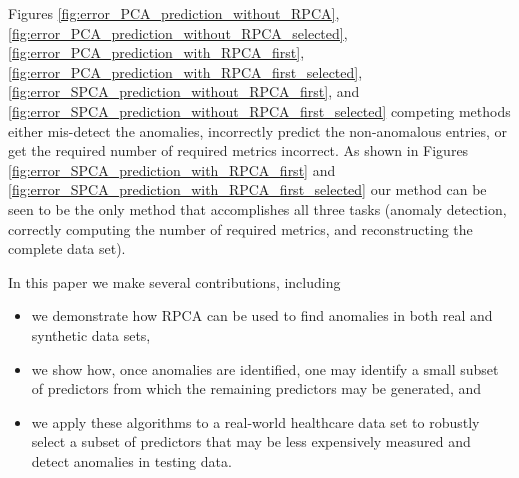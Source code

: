 \documentclass[conference]{IEEEtran}
\begin{document}
Figures \ref{fig:error_PCA_prediction_without_RPCA},
\ref{fig:error_PCA_prediction_without_RPCA_selected},
\ref{fig:error_PCA_prediction_with_RPCA_first},
\ref{fig:error_PCA_prediction_with_RPCA_first_selected},
\ref{fig:error_SPCA_prediction_without_RPCA_first}, and \ref{fig:error_SPCA_prediction_without_RPCA_first_selected} competing methods either mis-detect the anomalies, incorrectly predict the non-anomalous entries, or get the required number of required metrics incorrect.
As shown in Figures \ref{fig:error_SPCA_prediction_with_RPCA_first} and \ref{fig:error_SPCA_prediction_with_RPCA_first_selected} our method can be seen to be the only method that accomplishes all three tasks (anomaly detection, correctly computing the number of required metrics, and reconstructing the complete data set).


In this paper we make several contributions, including

\begin{itemize}
    \item we demonstrate how RPCA can be used to find anomalies in both real and synthetic data sets,
    \item we show how, once anomalies are identified, one may identify a small subset of predictors from which the remaining predictors may be generated, and
    \item we apply these algorithms to a real-world healthcare data set to robustly select a subset of predictors that may be less expensively measured and detect anomalies in testing data.
\end{itemize}
\end{document}
